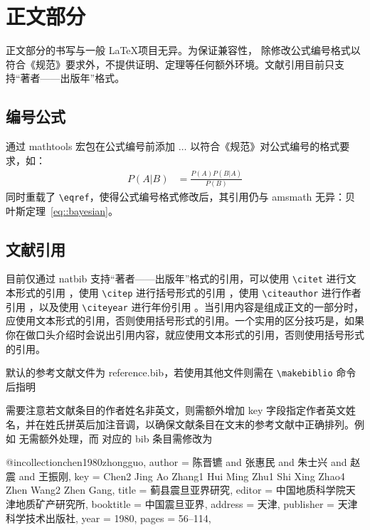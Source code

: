 \documentclass[bachelor, comfort]{shtthesis}
\begin{document}
\section{正文部分}
\shtthesis{} 正文部分的书写与一般 \LaTeX 项目无异。为保证兼容性，\shtthesis{} 除修改公式编号格式以符合《规范》要求外，不提供证明、定理等任何额外环境。文献引用目前只支持“著者——出版年”格式。

\subsection{编号公式}
\shtthesis{} 通过 \textsf{mathtools} 宏包在公式编号前添加 $\ldots$ 以符合《规范》对公式编号的格式要求，如：
\begin{align}
P(A|B) &= \frac{P(A)P(B|A)}{P(B)} \label{eq::bayesian}
\end{align}
同时重载了 \verb|\eqref|，使得公式编号格式修改后，其引用仍与 \textsf{amsmath} 无异：贝叶斯定理~\eqref{eq::bayesian}。

\subsection{文献引用} \label{sec::citation}
\shtthesis{} 目前仅通过 \textsf{natbib} 支持“著者——出版年”格式的引用，可以使用 \verb|\citet| 进行文本形式的引用 \citet{Bohan1928}，使用 \verb|\citep| 进行括号形式的引用 \citep{yuan2012lanc}，使用 \verb|\citeauthor| 进行作者引用 \citeauthor{niu2013zonghe}，以及使用 \verb|\citeyear| 进行年份引用 \citeyear{walls2013drought}。当引用内容是组成正文的一部分时，应使用文本形式的引用，否则使用括号形式的引用。一个实用的区分技巧是，如果你在做口头介绍时会说出引用内容，就应使用文本形式的引用，否则使用括号形式的引用。

\shtthesis{} 默认的参考文献文件为 reference.bib，若使用其他文件则需在 \verb|\makebiblio| 命令后指明
\begin{latex}
\makebiblio[mybiblio] %
\end{latex}
需要注意若文献条目的作者姓名非英文，则需额外增加 key 字段指定作者英文姓名，并在姓氏拼英后加注音调，以确保文献条目在文末的参考文献中正确排列。例如 \citet{bravo1990comparative} 无需额外处理，而 \citet{chen1980zhongguo} 对应的 bib 条目需修改为
\begin{latex}
@incollection{chen1980zhongguo,
  author    = {陈晋镳 and 张惠民 and 朱士兴 and 赵震 and 王振刚},
  key       = {Chen2 Jing Ao Zhang1 Hui Ming Zhu1 Shi Xing Zhao4 Zhen Wang2 Zhen Gang},
  title     = {蓟县震旦亚界研究},
  editor    = {中国地质科学院天津地质矿产研究所},
  booktitle = {中国震旦亚界},
  address   = {天津},
  publisher = {天津科学技术出版社},
  year      = {1980},
  pages     = {56--114},
}
\end{latex}
\end{document}
